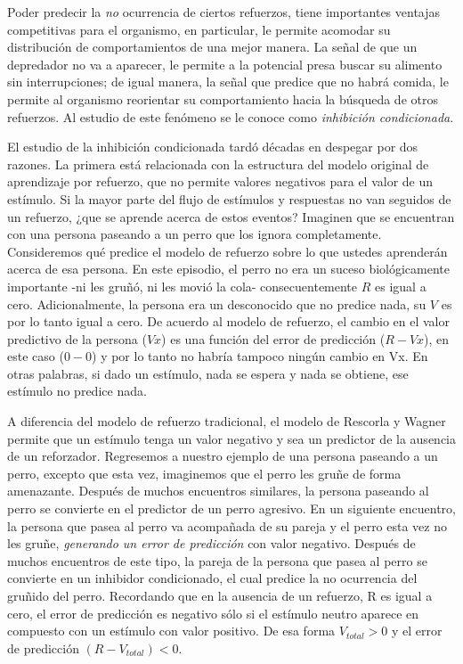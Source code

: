 \documentclass[
  letterpaper,
]{book}
\begin{document}
Poder predecir la \emph{no} ocurrencia de ciertos refuerzos, tiene
importantes ventajas competitivas para el organismo, en particular, le
permite acomodar su distribución de comportamientos de una mejor manera.
La señal de que un depredador no va a aparecer, le permite a la
potencial presa buscar su alimento sin interrupciones; de igual manera,
la señal que predice que no habrá comida, le permite al organismo
reorientar su comportamiento hacia la búsqueda de otros refuerzos. Al
estudio de este fenómeno se le conoce como \emph{inhibición
condicionada}.

El estudio de la inhibición condicionada tardó décadas en despegar por
dos razones. La primera está relacionada con la estructura del modelo
original de aprendizaje por refuerzo, que no permite valores negativos
para el valor de un estímulo. Si la mayor parte del ﬂujo de estímulos y
respuestas no van seguidos de un refuerzo, ¿que se aprende acerca de
estos eventos? Imaginen que se encuentran con una persona paseando a un
perro que los ignora completamente. Consideremos qué predice el modelo
de refuerzo sobre lo que ustedes aprenderán acerca de esa persona. En
este episodio, el perro no era un suceso biológicamente importante -ni
les gruñó, ni les movió la cola- consecuentemente \(R\) es igual a cero.
Adicionalmente, la persona era un desconocido que no predice nada, su
\(V\) es por lo tanto igual a cero. De acuerdo al modelo de refuerzo, el
cambio en el valor predictivo de la persona (\(Vx\)) es una función del
error de predicción (\(R - Vx\)), en este caso (\(0 - 0\)) y por lo
tanto no habría tampoco ningún cambio en Vx. En otras palabras, si dado
un estímulo, nada se espera y nada se obtiene, ese estímulo no predice
nada.

A diferencia del modelo de refuerzo tradicional, el modelo de Rescorla y
Wagner permite que un estímulo tenga un valor negativo y sea un
predictor de la ausencia de un reforzador. Regresemos a nuestro ejemplo
de una persona paseando a un perro, excepto que esta vez, imaginemos que
el perro les gruñe de forma amenazante. Después de muchos encuentros
similares, la persona paseando al perro se convierte en el predictor de
un perro agresivo. En un siguiente encuentro, la persona que pasea al
perro va acompañada de su pareja y el perro esta vez no les gruñe,
\emph{generando un error de predicción} con valor negativo. Después de
muchos encuentros de este tipo, la pareja de la persona que pasea al
perro se convierte en un inhibidor condicionado, el cual predice la no
ocurrencia del gruñido del perro. Recordando que en la ausencia de un
refuerzo, R es igual a cero, el error de predicción es negativo sólo si
el estímulo neutro aparece en compuesto con un estímulo con valor
positivo. De esa forma \(V_{total} > 0\) y el error de predicción
\((R - V_{total}) < 0\).
\end{document}
